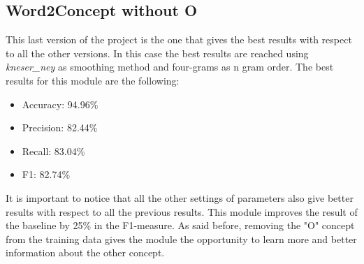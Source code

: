 \documentclass[11pt,a4paper]{article}
\begin{document}
\subsection{Word2Concept without O}

This last version of the project is the one that gives the best results with respect to all the other versions. In this case the best results are reached using \textit{kneser\_ney} as smoothing method and four-grams as n gram order. The best results for this module are the following:
\begin{itemize}
    \item Accuracy: 94.96\%
    \item Precision: 82.44\%
    \item Recall:   83.04\%
    \item F1:   82.74\%
\end{itemize}
It is important to notice that all the other settings of parameters also give better results with respect to all the previous results.
This module improves the result of the baseline by 25\% in the F1-measure. As said before, removing the "O" concept from the training data gives the module the opportunity to learn more and better information about the other concept.



%
%
\end{document}
